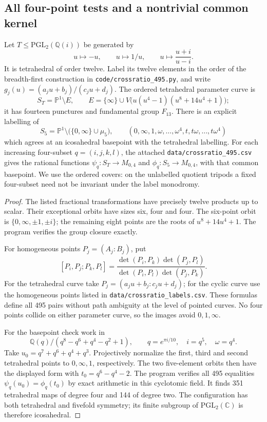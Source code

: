 \subsection*{All four-point tests and a nontrivial common kernel}

Let \(T\leq\mathrm{PGL}_2(\mathbb Q(i))\) be generated by
\[
 u\longmapsto-u,\qquad u\longmapsto1/u,\qquad
 u\longmapsto\frac{u+i}{u-i}.
\]
It is tetrahedral of order twelve. Label its twelve elements
in the order of the breadth-first construction in
\texttt{code/crossratio\_495.py}, and write
\(g_j(u)=(a_ju+b_j)/(c_ju+d_j)\).
The ordered tetrahedral parameter curve is
\[
 S_T=\mathbb P^1\setminus E,\qquad
 E=\{\infty\}\cup
 V\bigl(u(u^4-1)(u^8+14u^4+1)\bigr);
\]
it has fourteen punctures and fundamental group \(F_{13}\).
There is an explicit labelling of
\[
 S_5=\mathbb P^1\setminus\bigl(\{0,\infty\}\cup\mu_5\bigr),
 \qquad (0,\infty,1,\omega,\ldots,\omega^4,
                       t,t\omega,\ldots,t\omega^4)
\]
which agrees at an icosahedral basepoint with the tetrahedral labelling.
For each increasing four-subset \(q=(i,j,k,l)\), the attached
\texttt{data/crossratio\_495.csv} gives the rational functions
\(\psi_q:S_T\to M_{0,4}\) and \(\phi_q:S_5\to M_{0,4}\), with that
common basepoint. We use the ordered covers: on the unlabelled
quotient tripods a fixed four-subset need not be invariant under
the label monodromy.
\begin{proof}
The listed fractional transformations have precisely twelve products
up to scalar. Their exceptional orbits have sizes six, four and four.
The six-point orbit is \(\{0,\infty,\pm1,\pm i\}\); the remaining
eight points are the roots of \(u^8+14u^4+1\).
The program verifies the group closure exactly.

For homogeneous points \(P_j=(A_j:B_j)\), put
\[
 [P_i,P_j;P_k,P_l]
   =\frac{\det(P_i,P_k)\det(P_j,P_l)}
           {\det(P_i,P_l)\det(P_j,P_k)}.
\]
For the tetrahedral curve take
\(P_j=(a_ju+b_j:c_ju+d_j)\); for the cyclic curve use the
homogeneous points listed in
\texttt{data/crossratio\_labels.csv}. These formulas define all
495 pairs without path ambiguity at the level of pointed curves.
No four points collide on either parameter curve, so the images
avoid \(0,1,\infty\).

For the basepoint check work in
\[
 \mathbb Q(q)/(q^8-q^6+q^4-q^2+1),\qquad q=e^{\pi i/10},
 \quad i=q^5,\quad\omega=q^4.
\]
Take \(u_0=q^7+q^6+q^4+q^3\).
Projectively normalize the first, third and second tetrahedral
points to \(0,\infty,1\), respectively. The two five-element
orbits then have the displayed form with
\(t_0=q^6-q^4-2\). The program verifies all 495 equalities
\(\psi_q(u_0)=\phi_q(t_0)\) by exact arithmetic in this
cyclotomic field. It finds 351 tetrahedral maps of degree four
and 144 of degree two. The configuration has both tetrahedral
and fivefold symmetry; its finite subgroup of
\(\mathrm{PGL}_2(\mathbb C)\) is therefore icosahedral.
\end{proof}

